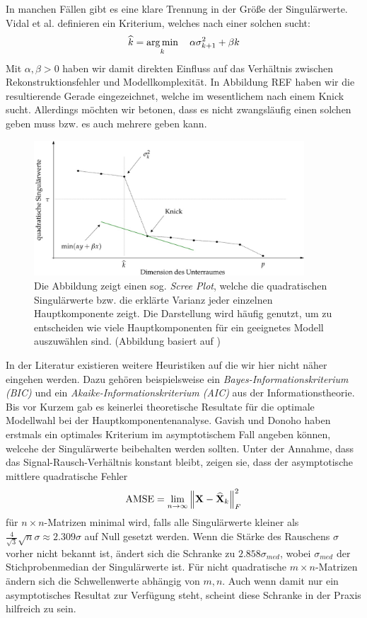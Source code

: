 In manchen Fällen gibt es eine klare Trennung in der Größe der Singulärwerte. Vidal et al. \cite{vidal} definieren ein Kriterium, welches nach einer solchen sucht:
\begin{align}
\widehat{k} = \operatorname*{arg\,min}_{k} \quad \alpha\sigma_{k+1}^2 + \beta k
\end{align}
Mit $\alpha, \beta > 0$ haben wir damit direkten Einfluss auf das Verhältnis zwischen Rekonstruktionsfehler und Modellkomplexität. In Abbildung REF haben wir die resultierende Gerade eingezeichnet, welche im wesentlichem nach einem Knick sucht. Allerdings möchten wir betonen, dass es nicht zwangsläufig einen solchen geben muss bzw. es auch mehrere geben kann.

\begin{figure}
\includegraphics[width=0.9\textwidth]{figures/scree_plot_explanation.jpg}
\caption{Die Abbildung zeigt einen sog. \textit{Scree Plot}, welche die quadratischen Singulärwerte bzw. die erklärte Varianz jeder einzelnen Hauptkomponente zeigt. Die Darstellung wird häufig genutzt, um zu entscheiden wie viele Hauptkomponenten für ein geeignetes Modell auszuwählen sind. (Abbildung basiert auf \cite{vidal})}
\label{scree_plot}
\end{figure}

In der Literatur existieren weitere Heuristiken auf die wir hier nicht näher eingehen werden. Dazu gehören beispielsweise ein \textit{Bayes-Informationskriterium (BIC)} und ein \textit{Akaike-Informationskriterium (AIC)} aus der Informationstheorie. Bis vor Kurzem gab es keinerlei theoretische Resultate für die optimale Modellwahl bei der Hauptkomponentenanalyse. Gavish und Donoho \cite{gavish} haben erstmals ein optimales Kriterium im asymptotischem Fall angeben können, welcehe der Singulärwerte beibehalten werden sollten. Unter der Annahme, dass das Signal-Rausch-Verhältnis konstant bleibt, zeigen sie, dass der asymptotische mittlere quadratische Fehler 
$$\operatorname{AMSE} = \lim_{n \rightarrow \infty} \left\lVert \mathbf{X} - \widehat{\mathbf{X}}_k \right\rVert_{F}^{2}$$
für $n \times n$-Matrizen minimal wird, falls alle Singulärwerte kleiner als $\frac{4}{\sqrt{3}}\sqrt{n}\sigma \approx 2.309\sigma$ auf Null gesetzt werden. Wenn die Stärke des Rauschens $\sigma$ vorher nicht bekannt ist, ändert sich die Schranke zu $2.858\sigma_{med}$, wobei $\sigma_{med}$ der Stichprobenmedian der Singulärwerte ist. Für nicht quadratische $m \times n$-Matrizen ändern sich die Schwellenwerte abhängig von $m,n$. Auch wenn damit nur ein asymptotisches Resultat zur Verfügung steht, scheint diese Schranke in der Praxis hilfreich zu sein.


